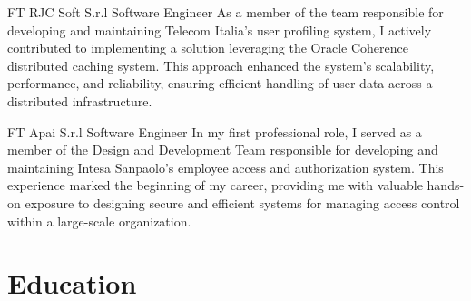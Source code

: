 \documentclass[10pt]{article} %
\begin{document}
\begin{paracol}{2}
{FT} %
{RJC Soft S.r.l} %
{Software Engineer} %
{As a member of the team responsible for developing and maintaining Telecom Italia's user profiling system,
I actively contributed to implementing a solution leveraging the Oracle Coherence distributed caching system.
This approach enhanced the system's scalability, performance, and reliability, ensuring efficient handling
of user data across a distributed infrastructure.} %

{FT} %
{Apai S.r.l} %
{Software Engineer} %
{In my first professional role, I served as a member of the Design and Development Team responsible for
developing and maintaining Intesa Sanpaolo's employee access and authorization system.
This experience marked the beginning of my career, providing me with valuable hands-on exposure to designing
secure and efficient systems for managing access control within a large-scale organization.} %


\vspace{-\baselineskip}\medskip %

\switchcolumn %
\newpage





\section{Education}




\end{paracol}
\end{document}
